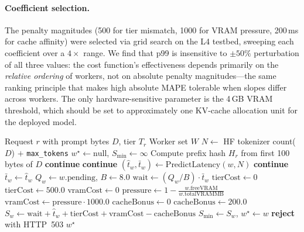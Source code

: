 \documentclass[10pt,twocolumn,letterpaper]{article}
\begin{document}
\paragraph{Coefficient selection.}
The penalty magnitudes (500 for tier mismatch, 1000 for VRAM pressure, 200\,ms for cache affinity) were selected via grid search on the L4 testbed, sweeping each coefficient over a $4{\times}$ range. We find that p99 is insensitive to $\pm50\%$ perturbation of all three values: the cost function's effectiveness depends primarily on the \emph{relative ordering} of workers, not on absolute penalty magnitudes---the same ranking principle that makes high absolute MAPE tolerable when slopes differ across workers. The only hardware-sensitive parameter is the 4\,GB VRAM threshold, which should be set to approximately one KV-cache allocation unit for the deployed model.

\begin{algorithm}[h]
\scriptsize
\setlength{\algorithmicindent}{0.8em}
\caption{Tier- and Roofline-Aware Scheduling (DIO)}
\vspace{-0.3em}
\label{alg:dio}
\begin{algorithmic}[1]
\REQUIRE Request $r$ with prompt bytes $D$, tier $T_r$
\REQUIRE Worker set $W$
\STATE $N \leftarrow$ HF tokenizer count($D$) $+$ \texttt{max\_tokens} 
\STATE $w^\star \leftarrow \text{null}$, $S_{\min} \leftarrow \infty$
\STATE Compute prefix hash $H_r$ from first 100 bytes of $D$
    \STATE \textbf{continue}
  \ENDIF
    \STATE \textbf{continue} 
  \ENDIF
  \STATE $(\hat{t}_w, \bar{t}_w) \leftarrow \text{PredictLatency}(w, N)$
    \STATE \textbf{continue} 
  \ENDIF
    \STATE $\bar{t}_w \leftarrow \hat{t}_w$
  \ENDIF
  \STATE $Q_w \leftarrow w.\text{pending}$, $B \leftarrow 8.0$
  \STATE $\text{wait} \leftarrow (Q_w / B) \cdot \bar{t}_w$
  \STATE $\text{tierCost} \leftarrow 0$
    \STATE $\text{tierCost} \leftarrow 500.0$
  \ENDIF
  \STATE $\text{vramCost} \leftarrow 0$
    \STATE $\text{pressure} \leftarrow 1 - \frac{w.\text{freeVRAM}}{w.\text{totalVRAMMB}}$
    \STATE $\text{vramCost} \leftarrow \text{pressure} \cdot 1000.0$
  \ENDIF
  \STATE $\text{cacheBonus} \leftarrow 0$
    \STATE $\text{cacheBonus} \leftarrow 200.0$
  \ENDIF
  \STATE $S_w \leftarrow \text{wait} + \hat{t}_w + \text{tierCost} + \text{vramCost} - \text{cacheBonus}$
    \STATE $S_{\min} \leftarrow S_w$, $w^\star \leftarrow w$
  \ENDIF
\ENDFOR
{}
  \STATE \textbf{reject} with HTTP~503 
\ENDIF
\RETURN $w^\star$
\end{algorithmic}
\normalsize
\end{algorithm}
\end{document}
